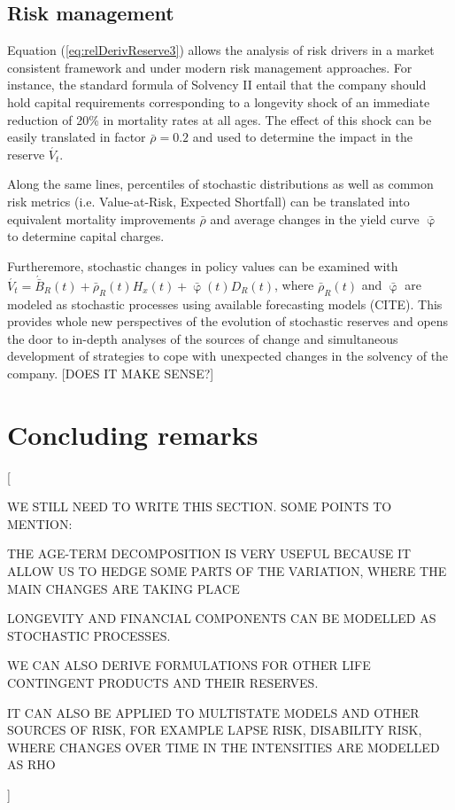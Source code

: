 \documentclass[12pt]{article}
\begin{document}
\subsection{Risk management}



Equation (\ref{eq:relDerivReserve3}) allows the analysis of risk drivers in a market consistent framework and under modern risk management approaches. For instance, the standard formula of Solvency II entail that the company should hold capital requirements corresponding to a longevity shock of an immediate reduction of 20\% in mortality rates at all ages. The effect of this shock can be easily translated in factor $\bar{\rho}=0.2$ and used to determine the impact in the reserve $\acute{V_t}$.
	
Along the same lines, percentiles of stochastic distributions as well as common risk metrics (i.e. Value-at-Risk, Expected Shortfall) can be translated into equivalent mortality improvements $\bar{\rho}$ and average changes in the yield curve $\bar{\upvarphi}$ to determine capital charges.

Furtheremore, stochastic changes in policy values can be examined with $\acute{V_t}=\acute{\bar{B}}_R(t)+ \bar{\rho}_R(t){H}_x(t) +\bar{\upvarphi}(t){D}_R(t)$, where $\bar{\rho}_R(t)$ and $\bar{\upvarphi}$ are modeled as stochastic processes using available forecasting models (CITE). This provides whole new perspectives of the evolution of stochastic reserves and opens the door to in-depth analyses of the sources of change and simultaneous development of strategies to cope with unexpected changes in the solvency of the company. [DOES IT MAKE SENSE?]



\section{Concluding remarks}\label{sec:6_Conclusion}


[{ WE STILL NEED TO WRITE THIS SECTION. SOME POINTS TO MENTION: 
	
	 THE AGE-TERM DECOMPOSITION IS VERY USEFUL BECAUSE IT ALLOW US TO HEDGE SOME PARTS OF THE VARIATION, WHERE THE MAIN CHANGES ARE TAKING PLACE
	
	LONGEVITY AND FINANCIAL COMPONENTS CAN BE MODELLED AS STOCHASTIC PROCESSES.
	
	 WE CAN ALSO DERIVE FORMULATIONS FOR OTHER LIFE CONTINGENT PRODUCTS AND THEIR RESERVES.
	 
	  IT CAN ALSO BE APPLIED TO MULTISTATE MODELS AND OTHER SOURCES OF RISK, FOR EXAMPLE LAPSE RISK, DISABILITY RISK, WHERE CHANGES OVER TIME IN THE INTENSITIES ARE MODELLED AS RHO}]
\end{document}
